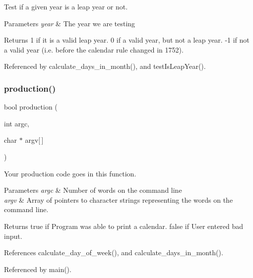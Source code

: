 Test if a given year is a leap year or not. 
\begin{DoxyParams}{Parameters}
{\em year} & The year we are testing \\
\hline
\end{DoxyParams}
\begin{DoxyReturn}{Returns}
1 if it is a valid leap year. 0 if a valid year, but not a leap year. -\/1 if not a valid year (i.\+e. before the calendar rule changed in 1752). 
\end{DoxyReturn}


Referenced by calculate\+\_\+days\+\_\+in\+\_\+month(), and test\+Is\+Leap\+Year().

\mbox{\label{production_8h_a9f67b51c42a54745557e7a2c9c07c46f}} 
\subsubsection{production()}
{\footnotesize\ttfamily bool production (\begin{DoxyParamCaption}\item[{int}]{argc,  }\item[{char $\ast$}]{argv[$\,$] }\end{DoxyParamCaption})}

Your production code goes in this function.


\begin{DoxyParams}{Parameters}
{\em argc} & Number of words on the command line \\
\hline
{\em argv} & Array of pointers to character strings representing the words on the command line. \\
\hline
\end{DoxyParams}
\begin{DoxyReturn}{Returns}
true if Program was able to print a calendar. false if User entered bad input. 
\end{DoxyReturn}


References calculate\+\_\+day\+\_\+of\+\_\+week(), and calculate\+\_\+days\+\_\+in\+\_\+month().



Referenced by main().

